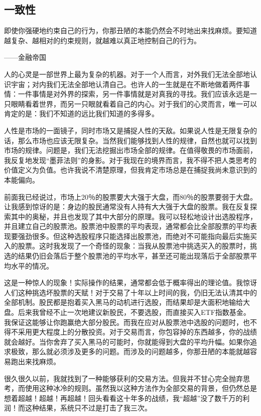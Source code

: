 \subsection{一致性}

{\kaishu
即使你强硬地约束自己的行为，你那丑陋的本能仍然会不时地出来找麻烦。要知道越复杂、越相对的约束规则，就越难以真正地控制自己的行为。

\hfill ——金融帝国
}

人的心灵是一部世界上最为复杂的机器。对于一个人而言，对外我们无法全部地认识宇宙；对内我们无法全部地认清自己。也许人的一生就是在不断地做着两件事情：一件事情是对外界的探索，另一件事情就是对真我的寻找。我们应该永远是一只眼睛看着世界，而另一只眼就看着自己的内心。对于我们的心灵而言，唯一可以肯定的是：我们不知道的远比我们知道的多得多。

人性是市场的一面镜子，同时市场又是捕捉人性的天敌。如果说人性是无限复杂的话，那么市场也应该无限复杂。当然我们能够找到人性的规律，自然也就可以找到市场的规律。问题是，我们无法挖掘出市场全部的规律。在值得敬畏的市场面前，我反复地发现“墨菲法则”的身影。对于我现在的境界而言，我不得不把人类思考的价值定义为负值。也许我说不清楚原理，但我肯定市场总是在捕捉我尚未意识到的本能偏向。

前面我已经说过，市场上20％的股票要大大强于大盘，而80％的股票要弱于大盘。让我感到惊讶的是：身边的股民通常没有人持有大大强于大盘的股票。我在反复探索其中的奥秘，并且也发现了其中大部分的原理。我可以轻松地设计出选股程序，并且建立自己的股票池。股票池中股票的平均表现，通常都会比全部股票的平均表现要强劲很多。但这种选股程序只能选择出股票池，而绝对不可能指向最后实施买入的股票。这时我发现了一个奇怪的现象：当我从股票池中挑选买入的股票时，挑选的结果仍旧会落后于整个股票池的平均水平，甚至还可能出现落后于全部股票平均水平的情况。

这是一种惊人的现象！实际操作的结果，通常都会低于概率得出的理论值。我惊讶人们这种挑选坏股票的天赋！对于交易了十年以上时间的我，仍旧无法认清其中的全部机制。股民都是抱着买入黑马的动机进行选股，而结果却是大面积地输给大盘。后来我曾经不止一次地建议新股民，不要选股，而直接买入ETF指数基金。我保证这能够让你跑赢绝大部分股民。而我在应对从股票池中选股的问题时，也不得不采用更大程度上的分散投资。对于交易而言，你包容掉的东西越多，你的战绩就会越好。当你舍弃了买入黑马的可能时，你就能得到大盘的平均升幅。如果你追求极致，那么就必须涉及更多的问题。而涉及的问题越多，你那丑陋的本能就越容易跑出来找麻烦。

很久很久以前，我就找到了一种能够获利的交易方法。但我并不甘心完全抛弃思考，而使用这种冰冷的规则。虽然我以这种方法作为全部交易的背景，但仍然总是想着超越！超越！再超越！回头看看这十年多的战绩，我“超越”没了数千万的利润！而这种结果，系统只不过是打击了我三次。

